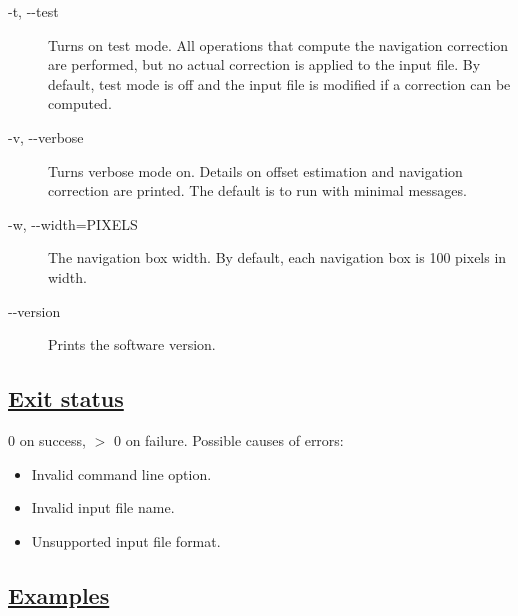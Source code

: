 \begin{description}
\item[ -t, -{-}test ] Turns on test mode. All operations that compute the navigation correction are performed, but no actual correction is applied to the input file. By default, test mode is off and the input file is modified if a correction can be computed. 
\item[ -v, -{-}verbose ] Turns verbose mode on. Details on offset estimation and navigation correction are printed. The default is to run with minimal messages. 
\item[ -w, -{-}width=PIXELS ] The navigation box width. By default, each navigation box is 100 pixels in width. 
\item[-{-}version]Prints the software version.

\end{description}
\subsection*{\underline{Exit status}}


  0 on success, $>$ 0 on failure. Possible causes of errors: \begin{itemize}
\item  Invalid command line option. 
\item  Invalid input file name. 
\item  Unsupported input file format. 

\end{itemize}

\subsection*{\underline{Examples}}


